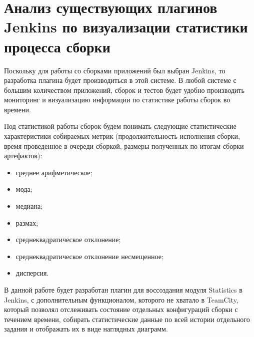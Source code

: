  
\section{Анализ существующих плагинов Jenkins по визуализации статистики процесса сборки} \label{ch1:sec5}



Поскольку для работы со сборками приложений был выбран Jenkins, то разработка плагина будет производиться в этой системе. В любой системе с большим количеством приложений, сборок и тестов будет удобно производить мониторинг и визуализацию информации по статистике работы сборок во времени. 

Под статистикой работы сборок будем понимать следующие статистические характеристики собираемых метрик (продолжительность исполнения сборки, время проведенное в очереди сборкой, размеры полученных по итогам сборки артефактов):

\begin{itemize}
	\item среднее арифметическое;
	\item мода;
	\item медиана;
	\item размах;
	\item среднеквадратическое отклонение;
	\item среднеквадратическое отклонение несмещенное;
	\item дисперсия.
\end{itemize}


В данной работе будет разработан плагин для воссоздания модуля Statistics в Jenkins, с дополнительным функционалом, которого не хватало в TeamCity, который позволял отслеживать состояние отдельных конфигураций сборки с течением времени, собирать статистические данные по всей истории отдельного задания и отображать их в виде наглядных диаграмм.

